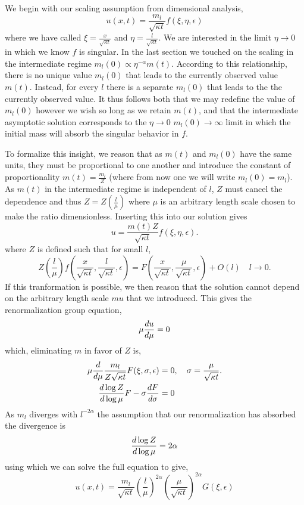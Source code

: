 We begin with our scaling assumption from dimensional analysis,
\[u(x, t) = \frac{m_l}{\sqrt{\kappa t}} f(\xi, \eta, \epsilon)\]
where we have called $\xi = \frac{x}{\sqrt{\kappa t}}$ and  $\eta = \frac{l}{\sqrt{\kappa t}}$.
We are interested in the limit $\eta \to 0$ in which we know $f$ is singular.  In the last
section we touched on the scaling in the intermediate regime $m_l(0) \propto \eta^{-\alpha} m(t)$.
According to this relationship, there is no unique value $m_l(0)$ that leads to the currently
observed value $m(t)$.  Instead, for every $l$ there is a separate $m_l(0)$ that leads to the
the currently observed value.  It thus follows both that we may redefine the value of $m_l(0)$
however we wish so long as we retain $m(t)$, and that the intermediate asymptotic solution
corresponds to the $\eta\to 0$ $m_l(0) \to \infty$ limit in which the initial mass will absorb
the singular behavior in $f$.

To formalize this insight, we reason that as $m(t)$ and $m_l(0)$ have the same units, they must
be proportional to one another and introduce the constant of proportionality $m(t) = \frac{m_l}{Z}$
(where from now one we will write $m_l(0) = m_l$).  As $m(t)$ in the intermediate regime is
independent of $l$, $Z$ must cancel the dependence and thus $Z=Z(\frac{l}{\mu})$ where $\mu$ is
an arbitrary length scale chosen to make the ratio dimensionless.  Inserting this into our solution
gives 
\[u = \frac{m(t)Z}{\sqrt{\kappa t}} f\left(\xi, \eta, \epsilon \right).\]
where $Z$ is defined such that for small $l$,
\[Z\left(\frac{l}{\mu} \right) f\left(\frac{x}{\sqrt{\kappa t}}, \frac{l}{\sqrt{\kappa t}},\epsilon\right)
 = F\left(\frac{x}{\sqrt{\kappa t}}, \frac{\mu}{\sqrt{\kappa t}}, \epsilon\right) + O(l)\quad l\to 0.\]
If this tranformation is possible, we then reason that the solution cannot depend on the 
arbitrary length scale $mu$ that we introduced.  This gives the renormalization group equation,
\[\mu \frac{d u}{d \mu} = 0\]
which, eliminating $m$ in favor of $Z$  is,
\begin{align*}
\mu \frac{d }{d \mu} \frac{m_l}{Z\sqrt{\kappa t}}F(\xi, \sigma, \epsilon) &= 0, \quad \sigma = 
\frac{\mu}{\sqrt{\kappa t}}.\\
\frac{d \log Z}{d \log \mu}F - \sigma \frac{d F}{d \sigma} &= 0
\end{align*}
As $m_l$ diverges with $l^{-2\alpha}$ the assumption that our renormalization has absorbed
the divergence is
\[\frac{d \log Z}{d \log \mu} = 2\alpha\]
using which we can solve the full equation to give,
\[u(x, t) = \frac{m_l}{\sqrt{\kappa t}}\left(\frac{l}{\mu}\right)^{2\alpha} 
\left(\frac{\mu}{\sqrt{\kappa t}}\right)^{2\alpha} G(\xi, \epsilon) \]

